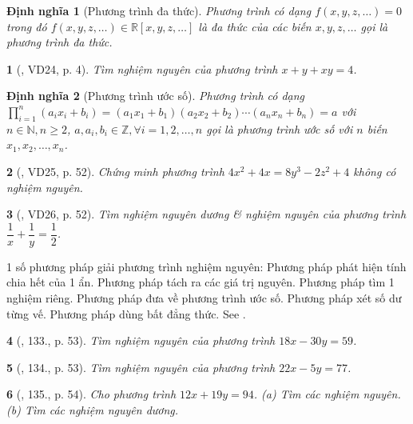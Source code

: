 \documentclass{article}
\newtheorem{baitoan}{}
\newtheorem{dinhnghia}{Định nghĩa}
\begin{document}
\begin{dinhnghia}[Phương trình đa thức]
	Phương trình có dạng $f(x,y,z,\ldots) = 0$ trong đó $f(x,y,z,\ldots)\in\mathbb{R}[x,y,z,\ldots]$ là đa thức của các biến $x,y,z,\ldots$ gọi là {\rm phương trình đa thức}.
\end{dinhnghia}

\begin{baitoan}[\cite{Tuyen_Toan_9_old}, VD24, p. 4]
	Tìm nghiệm nguyên của phương trình $x + y + xy = 4$.
\end{baitoan}

\begin{dinhnghia}[Phương trình ước số]
	Phương trình có dạng $\prod_{i=1}^n (a_ix_i + b_i) = (a_1x_1 + b_1)(a_2x_2 + b_2)\cdots(a_nx_n + b_n) = a$ với $n\in\mathbb{N},n\ge2$, $a,a_i,b_i\in\mathbb{Z},\forall i = 1,2,\ldots,n$ gọi là {\rm phương trình ước số} với $n$ biến $x_1,x_2,\ldots,x_n$.
\end{dinhnghia}

\begin{baitoan}[\cite{Tuyen_Toan_9_old}, VD25, p. 52]
	Chứng minh phương trình $4x^2 + 4x = 8y^3 - 2z^2 + 4$ không có nghiệm nguyên.
\end{baitoan}

\begin{baitoan}[\cite{Tuyen_Toan_9_old}, VD26, p. 52]
	Tìm nghiệm nguyên dương \& nghiệm nguyên của phương trình $\dfrac{1}{x} + \dfrac{1}{y} = \dfrac{1}{2}$.
\end{baitoan}
1 số phương pháp giải phương trình nghiệm nguyên: Phương pháp phát hiện tính chia hết của 1 ẩn. Phương pháp tách ra các giá trị nguyên. Phương pháp tìm 1 nghiệm riêng. Phương pháp đưa về phương trình ước số. Phương pháp xét số dư từng vế. Phương pháp dùng bất đẳng thức. See \cite{Binh_PTNN}.

\begin{baitoan}[\cite{Tuyen_Toan_9_old}, 133., p. 53]
	Tìm nghiệm nguyên của phương trình $18x - 30y = 59$.
\end{baitoan}

\begin{baitoan}[\cite{Tuyen_Toan_9_old}, 134., p. 53]
	Tìm nghiệm nguyên của phương trình $22x - 5y = 77$.
\end{baitoan}

\begin{baitoan}[\cite{Tuyen_Toan_9_old}, 135., p. 54]
	Cho phương trình $12x + 19y = 94$. (a) Tìm các nghiệm nguyên. (b) Tìm các nghiệm nguyên dương.
\end{baitoan}
\end{document}
